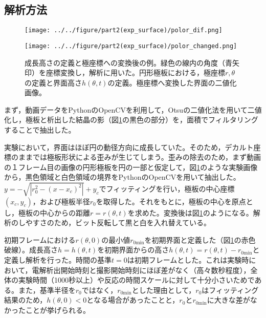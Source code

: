 \documentclass[autodetect-engine,dvi=dvipdfmx,a4paper,ja=standard,oneside,openany,11pt]{bxjsbook}
\begin{document}
\subsection{解析方法}
\begin{figure}[htbp]
  \begin{minipage}
    {0.64\textwidth}
    \subcaption{}
    \centering
    \texttt{[image: ../../figure/part2(exp\_surface)/polor\_dif.png]}
    \label{fig:surface_hight_def}
  \end{minipage}
  \begin{minipage}
    {0.32\textwidth}
    \subcaption{}
    \centering
    \texttt{[image: ../../figure/part2(exp\_surface)/polor\_changed.png]}
    \label{fig:polor_changed}
  \end{minipage}
  \caption{成長高さの定義と極座標への変換後の例。緑色の線内の角度（青矢印）を座標変換し，解析に用いた。円形極板における，極座標$r,\theta$の定義と界面高さ$h(\theta,t)$の定義。極座標へ変換した界面の二値化画像。}
  \label{fig:surface_hight_def_polor_changed}
\end{figure}
まず，動画データをPythonのOpenCVを利用して，Otsuの二値化法を用いて二値化し，極板と析出した結晶の影（図\ref{fig:surface_hight_def_polor_changed}の黒色の部分）を，面積でフィルタリングすることで抽出した。

実験において，界面はほぼ円の動径方向に成長していた。そのため，デカルト座標のままでは極板形状による歪みが生じてしまう。歪みの除去のため，まず動画の１フレーム目の画像の円形極板を円の一部と仮定して，図\ref{fig:surface_hight_def_polor_changed}のような実験画像から，黒色領域と白色領域の境界をPythonのOpenCVを用いて抽出した。$y=-\sqrt{|r_0^2-(x-x_c)^2|}+y_c$でフィッティングを行い，極板の中心座標$(x_c,y_c)$，および極板半径$r_0$を取得した。それをもとに，極板の中心を原点とし，極板の中心からの距離$r=r(\theta,t)$を求めた。変換後は図\ref{fig:surface_hight_def_polor_changed}のようになる。解析のしやすさのため，ビット反転して黒と白を入れ替えている。

初期フレームにおける$r(\theta,0)$の最小値$r_{0\mathrm{min}}$を初期界面と定義した（図\ref{fig:surface_hight_def_polor_changed}の赤色破線）。成長高さ$h=h(\theta,t)$を初期界面からの高さ$h(\theta,t)=r(\theta,t)-r_{0\mathrm{min}}$と定義し解析を行った。時間の基準$t=0$は初期フレームとした。これは実験時において，電解析出開始時刻と撮影開始時刻にほぼ差がなく（高々数秒程度），全体の実験時間（1000秒以上）や反応の時間スケールに対して十分小さいためである。また，基準半径を$r_0$ではなく，$r_{0\mathrm{min}}$とした理由として，$r_0$はフィッティング結果のため，$h(\theta,0)<0$となる場合があったことと，$r_0$と$r_{0\mathrm{min}}$に大きな差がなかったことが挙げられる。
\end{document}
